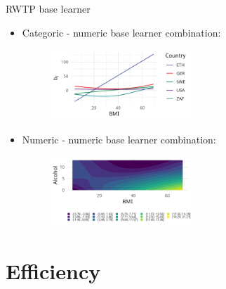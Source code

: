 \documentclass[t,10pt]{beamer}
\newcommand{\fSlide}[2]{
\begin{frame}[plain]{}%
  \vspace{4cm}%
  \Large #1\\[0.2cm]%
  {\LARGE\textbf{#2}}%
	\addtocounter{framenumber}{-1}%
\end{frame}%
}
\begin{document}
\begin{frame}{RWTP base learner}
  \begin{itemize}
    \item Categoric - numeric base learner combination:
      \begin{figure}
        \centering
        \includegraphics[width=0.5\textwidth]{figures/bs-tensor/fig-cat-num.png}
      \end{figure}
    \item Numeric - numeric base learner combination:
      \begin{figure}
        \centering
        \includegraphics[width=0.5\textwidth]{figures/bs-tensor/fig-num-num.png}
      \end{figure}
  \end{itemize}
\end{frame}



%



\section{Efficiency}
\end{document}
